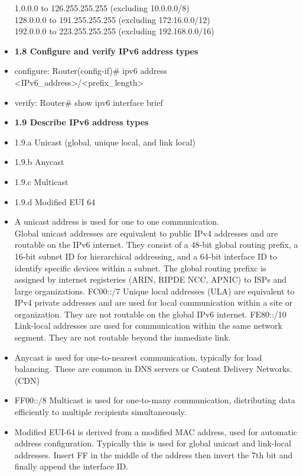 \documentclass{article}
\begin{document}
\begin{itemize}
		1.0.0.0 to 126.255.255.255 (excluding 10.0.0.0/8)\\
		128.0.0.0 to 191.255.255.255 (excluding 172.16.0.0/12)\\
		192.0.0.0 to 223.255.255.255 (excluding 192.168.0.0/16)
  	
  
  \item \textbf{1.8 Configure and verify IPv6 address types}
  	\item[] configure: Router(config-if)\# ipv6 address \textless IPv6\_address\textgreater/\textless prefix\_length\textgreater
  	\item[] verify: Router\# show ipv6 interface brief
  
  \item \textbf{1.9 Describe IPv6 address types}
  \item 1.9.a Unicast (global, unique local, and link local)
  \item 1.9.b Anycast
  \item 1.9.c Multicast
  \item 1.9.d Modified EUI 64
  	\item[] A unicast address is used for one to one communication.\\
		Global unicast addresses are equivalent to public IPv4 addresses and are routable on the IPv6 internet. They consist of a 48-bit global routing prefix, a 16-bit subnet ID for hierarchical addressing, and a 64-bit interface ID to identify specific devices within a subnet. The global routing prefixc is assigned by internet registeries (ARIN, RIPDE NCC, APNIC) to ISPs and large organizations. FC00::/7 Unique local addresses (ULA) are equivalent to IPv4 private addresses and are used for local communication within a site or organization. They are not routable on the global IPv6 internet. FE80::/10 Link-local addresses are used for communication within the same network segment. They are not routable beyond the immediate link. 
	\item[] Anycast is used for one-to-nearest communication, typically for load balancing. These are common in DNS servers or Content Delivery Networks. (CDN)
	\item[] FF00::/8 Multicast is used for one-to-many communication, distributing data efficiently to multiple recipients simultaneously.
	\item[] Modified EUI-64 is derived from a modified MAC address, used for automatic address configuration. Typically this is used for global unicast and link-local addresses. Insert FF in the middle of the address then invert the 7th bit and finally append the interface ID.
  

\end{itemize}
\end{document}
